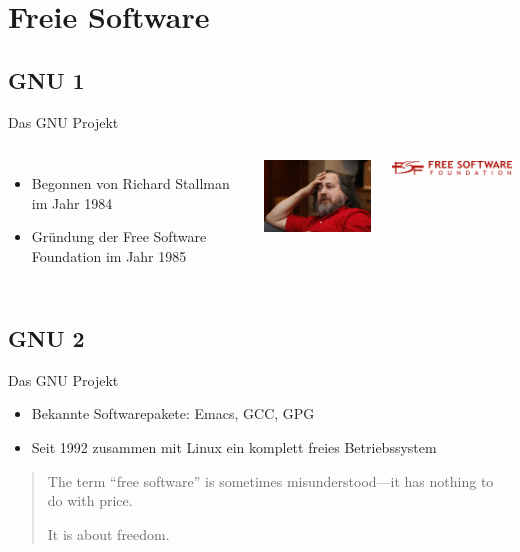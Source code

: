 \documentclass[12pt]{beamer}
\begin{document}
\section{Freie Software}


\subsection{GNU 1}
\begin{frame}{Das GNU Projekt}

\begin{columns}


\column{6cm}
\begin{itemize}
\item Begonnen von Richard Stallman im Jahr 1984 
\item Gründung der Free Software Foundation im Jahr 1985 
\end{itemize}

\column{7cm}


\begin{center}
\includegraphics[width=4.5cm]{img/stallman}
\par\end{center}


\begin{center}
\includegraphics[width=5cm]{img/logo-fsf}
\par\end{center}

\end{columns}
\end{frame}



\subsection{GNU 2}
\begin{frame}{Das GNU Projekt}

\begin{itemize}
\item Bekannte Softwarepakete: Emacs, GCC, GPG 
\item Seit 1992 zusammen mit Linux ein komplett freies Betriebssystem \end{itemize}
\begin{quote}
\textquotedbl{}The term “free software” is sometimes misunderstood—it
has nothing to do with price. 

It is about freedom.\textquotedbl{} 
\end{quote}
\end{frame}
\end{document}
